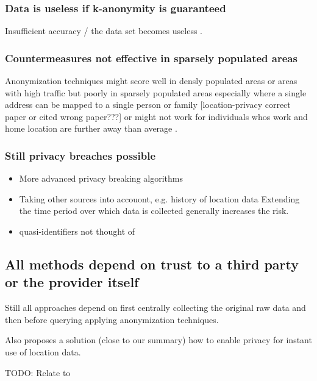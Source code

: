 \subsubsection{Data is useless if k-anonymity is guaranteed}
Insufficient accuracy / the data set becomes useless \parencite{krumm, cellphone, k-anonymity-old, k-anonymity, k-anonymity-achieving}.

\subsubsection{Countermeasures not effective in sparsely populated areas}
Anonymization techniques might score well in densly populated areas or areas with high traffic but poorly in sparsely populated areas especially where a single address can be mapped to a single person or family \parencite{time-to-confusion, location-privacy, hoh2006enhancing} [location-privacy correct paper or cited wrong paper???] or might not work for individuals whos work and home location are further away than average \parencite{privacy-home-work-pairs}.

\subsubsection{Still privacy breaches possible}
\begin{itemize}
	\item More advanced privacy breaking algorithms
\item Taking other sources into accouont, e.g. history of location data
Extending the time period over which data is collected generally increases the risk.

\item quasi-identifiers not thought of
\end{itemize}

\subsection{All methods depend on trust to a third party or the provider itself}
Still all approaches depend on first centrally collecting the original raw data and then before querying \parencite{k-anonymity} applying anonymization techniques.

		Also \parencite{casper} proposes a solution (close to our summary) how to enable privacy for instant use of location data.


TODO: Relate to \parencite{k-anonymity}

